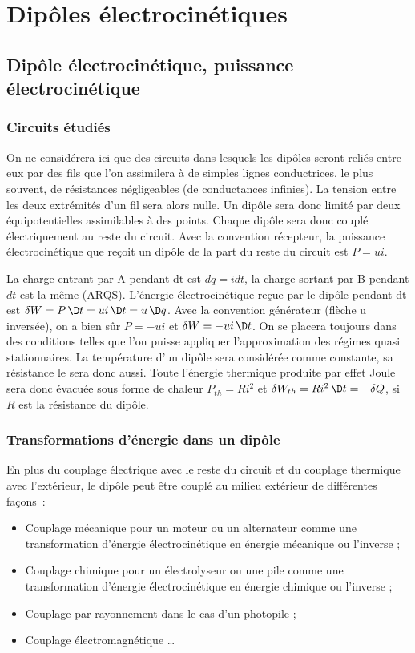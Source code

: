 \chapter{Dipôles électrocinétiques}

\section{Dipôle électrocinétique, puissance électrocinétique}
\subsection{Circuits étudiés}

On ne considérera ici que des circuits dans lesquels les dipôles seront reliés entre eux par des fils que l'on assimilera à de simples lignes conductrices, le plus souvent, de résistances négligeables (de conductances infinies). La tension entre les deux extrémités d'un fil sera alors nulle. Un dipôle sera donc limité par deux équipotentielles assimilables à des points. Chaque dipôle sera donc couplé électriquement au reste du circuit. Avec la convention récepteur, la puissance électrocinétique que reçoit un dipôle de la part du reste du circuit est $P = ui$.

La charge entrant par A pendant dt est $dq = i dt$, la charge sortant par B pendant $dt$ est la même (ARQS). L'énergie électrocinétique reçue par le dipôle pendant dt est  $\delta W = P \diff t = u i \diff t = u \diff q$. Avec la convention générateur (flèche u inversée), on a bien sûr $P  = - u i$  et  $\delta W = - u i \diff t$. On se placera toujours dans des conditions telles que l'on puisse appliquer l'approximation des régimes quasi stationnaires. La température d'un dipôle sera considérée comme constante, sa résistance le sera donc aussi. Toute l'énergie thermique produite par effet Joule sera donc évacuée sous forme de chaleur $P_{th} = R i^2$ et  $\delta W_{th} = R i^2 \diff t = -\delta Q$, si $R$ est la résistance du dipôle.

\subsection{Transformations d'énergie dans un dipôle}
En plus du couplage électrique avec le reste du circuit et du couplage thermique avec l'extérieur, le dipôle peut être couplé au milieu extérieur de différentes façons~:
\begin{itemize}
\item Couplage mécanique pour un moteur ou un alternateur comme une transformation d'énergie électrocinétique en énergie mécanique ou l'inverse ;
\item Couplage chimique pour un électrolyseur ou une pile comme une transformation d'énergie électrocinétique en énergie chimique ou l'inverse ;
\item Couplage par rayonnement  dans le cas d'un photopile ;
\item Couplage électromagnétique \ldots
\end{itemize}

